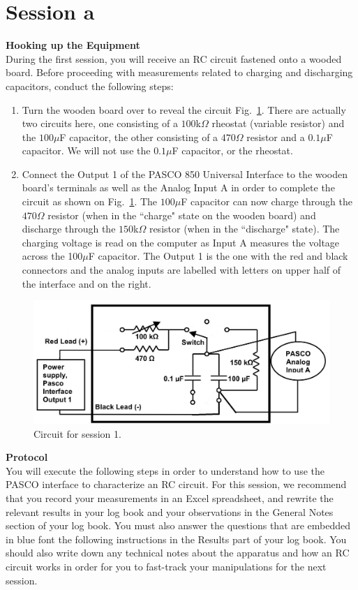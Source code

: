 \documentclass[12pt]{report}
\begin{document}
\section{Session a}
\noindent \large \textbf{Hooking up the Equipment} \normalsize \\
During the first session, you will receive an RC circuit fastened onto a wooded board. 
Before proceeding with measurements related to charging and discharging capacitors, conduct the following steps:
\begin{enumerate}
\item Turn the wooden board over to reveal the circuit Fig.~\ref{Fig:lab2-session1-circuit1}. 
There are actually two circuits here, one consisting of a $100$k$\Omega$ rheostat (variable resistor) and the $100\mu$F capacitor, the other consisting of a $470\Omega$ resistor and a $0.1\mu$F capacitor. 
We will not use the $0.1 \mu$F capacitor, or the rheostat.
\item Connect the Output 1 of the PASCO 850 Universal Interface to the wooden board's terminals as well as the Analog Input A in order to complete the circuit as shown on Fig.~\ref{Fig:lab2-session1-circuit1}. 
The $100\mu$F capacitor can now charge through the $470\Omega$ resistor (when in the ``charge" state on the wooden board) and discharge through the $150$k$\Omega$ resistor (when in the ``discharge" state). 
The charging voltage is read on the computer as Input A measures the voltage across the 100$\mu$F capacitor. 
The Output 1 is the one with the red and black connectors and the analog inputs are labelled with letters on upper half of the interface and on the right.
\end{enumerate}

\begin{figure}[h]
\centering
\includegraphics[width=0.75\linewidth]{lab2-session1-circuit2}
\caption{Circuit for session 1.}
\label{Fig:lab2-session1-circuit1}
\end{figure}


\noindent \large \textbf{Protocol} \normalsize \\
You will execute the following steps in order to understand how to use the PASCO interface to characterize an RC circuit. 
For this session, we recommend that you {\color{blue} record your measurements in an Excel spreadsheet, and rewrite the relevant results in your log book and your observations in the General Notes section of your log book. You must also answer the questions that are embedded in blue font the following instructions in the Results part of your log book. You should also write down any technical notes about the apparatus and how an RC circuit works in order for you to fast-track your manipulations for the next session.}
\end{document}
